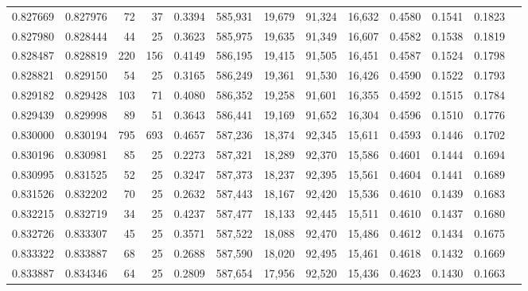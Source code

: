 \begin{tabular}{rrrrrrrrrrrrr}
0.827669 & 0.827976 &    72 &  37 &                                     0.3394 & 585,931 &  19,679 &  91,324 &  16,632 & 0.4580 & 0.1541 & 0.1823 \\
0.827980 & 0.828444 &    44 &  25 &                                     0.3623 & 585,975 &  19,635 &  91,349 &  16,607 & 0.4582 & 0.1538 & 0.1819 \\
0.828487 & 0.828819 &   220 & 156 &                                     0.4149 & 586,195 &  19,415 &  91,505 &  16,451 & 0.4587 & 0.1524 & 0.1798 \\
0.828821 & 0.829150 &    54 &  25 &                                     0.3165 & 586,249 &  19,361 &  91,530 &  16,426 & 0.4590 & 0.1522 & 0.1793 \\
0.829182 & 0.829428 &   103 &  71 &                                     0.4080 & 586,352 &  19,258 &  91,601 &  16,355 & 0.4592 & 0.1515 & 0.1784 \\
0.829439 & 0.829998 &    89 &  51 &                                     0.3643 & 586,441 &  19,169 &  91,652 &  16,304 & 0.4596 & 0.1510 & 0.1776 \\
0.830000 & 0.830194 &   795 & 693 &                                     0.4657 & 587,236 &  18,374 &  92,345 &  15,611 & 0.4593 & 0.1446 & 0.1702 \\
0.830196 & 0.830981 &    85 &  25 &                                     0.2273 & 587,321 &  18,289 &  92,370 &  15,586 & 0.4601 & 0.1444 & 0.1694 \\
0.830995 & 0.831525 &    52 &  25 &                                     0.3247 & 587,373 &  18,237 &  92,395 &  15,561 & 0.4604 & 0.1441 & 0.1689 \\
0.831526 & 0.832202 &    70 &  25 &                                     0.2632 & 587,443 &  18,167 &  92,420 &  15,536 & 0.4610 & 0.1439 & 0.1683 \\
0.832215 & 0.832719 &    34 &  25 &                                     0.4237 & 587,477 &  18,133 &  92,445 &  15,511 & 0.4610 & 0.1437 & 0.1680 \\
0.832726 & 0.833307 &    45 &  25 &                                     0.3571 & 587,522 &  18,088 &  92,470 &  15,486 & 0.4612 & 0.1434 & 0.1675 \\
0.833322 & 0.833887 &    68 &  25 &                                     0.2688 & 587,590 &  18,020 &  92,495 &  15,461 & 0.4618 & 0.1432 & 0.1669 \\
0.833887 & 0.834346 &    64 &  25 &                                     0.2809 & 587,654 &  17,956 &  92,520 &  15,436 & 0.4623 & 0.1430 & 0.1663 \\

\end{tabular}
